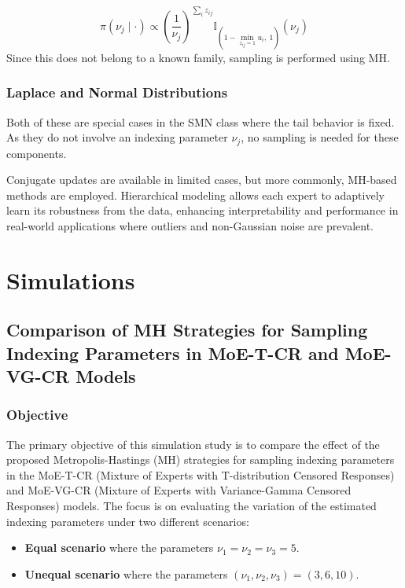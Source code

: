 \documentclass[10.5pt]{article} %
\begin{document}
\[
\pi(\nu_j \mid \cdot) \propto \left( \frac{1}{\nu_j} \right)^{\sum_i z_{ij}} 
\mathbb{I}_{(1 - \min_{z_{ij}=1} u_i,\ 1)}(\nu_j)
\]
\noindent
Since this does not belong to a known family, sampling is performed using MH.

\subsubsection{Laplace and Normal Distributions}
Both of these are special cases in the SMN class where the tail behavior is fixed. As they do not involve an indexing parameter $\nu_j$, no sampling is needed for these components.

\vspace{1em}
\noindent
Conjugate updates are available in limited cases, but more commonly, MH-based methods are employed. Hierarchical modeling allows each expert to adaptively learn its robustness from the data, enhancing interpretability and performance in real-world applications where outliers and non-Gaussian noise are prevalent.

\newpage

\section{Simulations}
\subsection{Comparison of MH Strategies for Sampling Indexing Parameters in MoE-T-CR and MoE-VG-CR Models}

\subsubsection{Objective}
The primary objective of this simulation study is to compare the effect of the proposed Metropolis-Hastings (MH) strategies for sampling indexing parameters in the MoE-T-CR (Mixture of Experts with T-distribution Censored Responses) and MoE-VG-CR (Mixture of Experts with Variance-Gamma Censored Responses) models. The focus is on evaluating the variation of the estimated indexing parameters under two different scenarios:

\begin{itemize}
    \item \textbf{Equal scenario} where the parameters \( \nu_1 = \nu_2 = \nu_3 = 5 \).
    \item \textbf{Unequal scenario} where the parameters \( (\nu_1, \nu_2, \nu_3) = (3, 6, 10) \).
\end{itemize}
\end{document}

